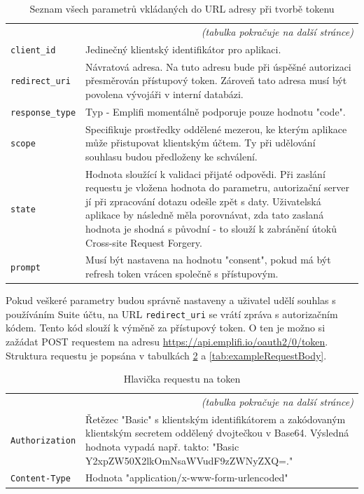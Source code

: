 \documentclass[czech, bc, kiv, he, iso690numb]{fasthesis}
\begin{document}
\begin{center}
	\begin{longtable}{p{}p{}}
	\caption{Seznam všech parametrů vkládaných do URL adresy při tvorbě tokenu \cite{emplifiDocs}}
	\label{tab:allParametersAPI}\\
	\toprule[1.5pt]
	\endhead
	\midrule
	\multicolumn{2}{r}{\textit{(tabulka pokračuje na další stránce)}}\\
	\endfoot
	\bottomrule[1.5pt]
	\endlastfoot
	\verb"client_id" &  Jedinečný klientský identifikátor pro aplikaci.\\
	\midrule
	\verb"redirect_uri" & Návratová adresa. Na tuto adresu bude při úspěšné autorizaci přesměrován přístupový token. Zároveň tato adresa musí být povolena vývojáři v interní databázi.\\
	\midrule
	\verb"response_type" & Typ - Emplifi momentálně podporuje pouze hodnotu "code".\\
	\midrule
	\verb"scope" & Specifikuje prostředky oddělené mezerou, ke kterým aplikace může přistupovat klientským účtem. Ty při udělování souhlasu budou předloženy ke schválení. \\
	\midrule
	\verb"state" & Hodnota sloužící k validaci přijaté odpovědi. Při zaslání requestu je vložena hodnota do parametru, autorizační server jí při zpracování dotazu odešle zpět s daty. Uživatelská aplikace by následně měla porovnávat, zda tato zaslaná hodnota je shodná s původní - to slouží k zabránění útoků Cross-site Request Forgery.\\
	\midrule
	\verb"prompt" & Musí být nastavena na hodnotu "consent", pokud má být refresh token vrácen společně s přístupovým.\\
	\end{longtable}
\end{center}


Pokud veškeré parametry budou správně nastaveny a uživatel udělí souhlas s používáním Suite účtu, na URL \texttt{redirect\_uri} se vrátí zpráva s autorizačním kódem. Tento kód
slouží k výměně za přístupový token. O ten je možno si zažádat POST requestem na adresu \url{https://api.emplifi.io/oauth2/0/token}. Struktura requestu je popsána v tabulkách \ref{tab:exampleRequestHeader} a \ref{tab:exampleRequestBody}.

\begin{center}
	\begin{longtable}{p{}p{}}
	\caption{Hlavička requestu na token \cite{emplifiDocs}}
	\label{tab:exampleRequestHeader}\\
	\toprule[1.5pt]
	\endhead
	\midrule
	\multicolumn{2}{r}{\textit{(tabulka pokračuje na další stránce)}}\\
	\endfoot
	\bottomrule[1.5pt]
	\endlastfoot
	\verb"Authorization" & Řetězec "Basic" s klientským identifikátorem a zakódovaným klientským secretem oddělený dvojtečkou v Base64. Výsledná hodnota vypadá např. takto: "Basic Y2xpZW50X2lkOmNsaWVudF9zZWNyZXQ=."\\
	\midrule
	\verb"Content-Type" & Hodnota "application/x-www-form-urlencoded" \\
	\end{longtable}
\end{center}
\end{document}
